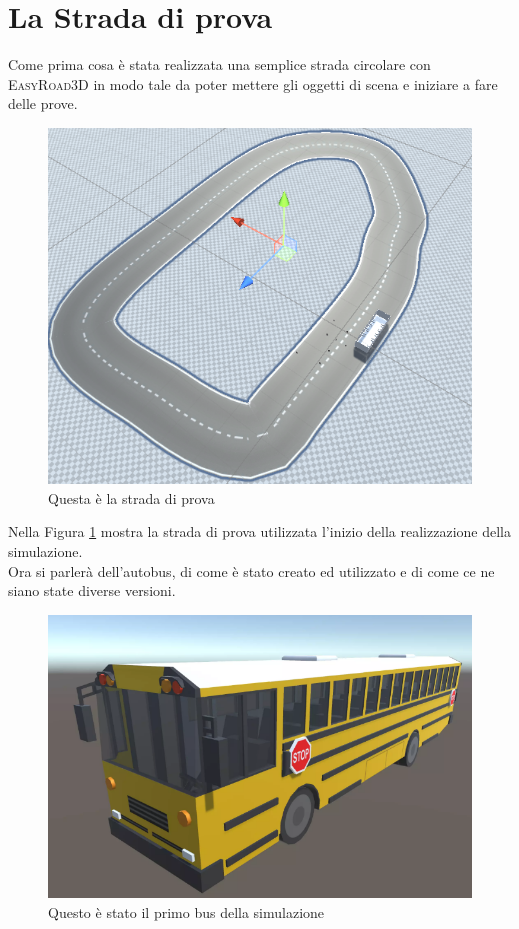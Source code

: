 \documentclass[12pt, openany]{book}
\begin{document}
	\section{La Strada di prova}
	Come prima cosa è stata realizzata una semplice strada circolare con \textsc{EasyRoad3D} in modo tale da poter mettere gli oggetti di scena e iniziare a fare delle prove.
	\begin{figure}[H]
		\centering
		\includegraphics[width=0.7\linewidth]{"Immagini/StradaBase.png"}
		\caption{Questa è la strada di prova}
		\label{fig:StradaBase}
	\end{figure}
	Nella Figura \ref{fig:StradaBase} mostra la strada di prova utilizzata l'inizio della realizzazione della simulazione.\\
	Ora si parlerà dell'autobus, di come è stato creato ed utilizzato e di come ce ne siano state diverse versioni. 
	\begin{figure}[H]
		\centering
		\includegraphics[width=0.7\linewidth]{"Immagini/SchoolBus.png"}
		\caption{Questo è stato il primo bus della simulazione}
		\label{fig:SchoolBus}
	\end{figure}
\end{document}
